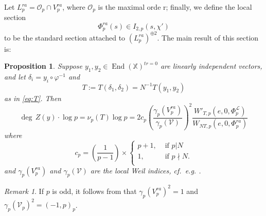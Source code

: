 \documentclass[reqno,oneside]{amsart}
\theoremstyle{plain}
\newtheorem{proposition}[theorem]{Proposition}
\theoremstyle{remark}
\newtheorem{remark}[theorem]{Remark}
\numberwithin{theorem}{section}
\newcommand{\bbX}{\mathbb X}
\newcommand{\calL}{\mathcal L}
\newcommand{\calO}{\mathcal O}
\newcommand{\calV}{\mathcal V}
\DeclareMathOperator{\End}{End}
\begin{document}
	Let $L^{ra}_{p} = \calO_{p} \cap V^{ra}_{p}$, where $\calO_{p}$ is the maximal orde                                                                                                                  r; finally, we define the local section
	\begin{equation}
	\Phi^{ra}_{p}(s) \in I_{2,p}(s, \chi')
	\end{equation} to be the standard section attached to $(L^{ra}_{p})^{\oplus 2}$.
	The main result of this section is:
	\begin{proposition} \label{prop:local intersection number}
		Suppose  $y_1, y_2 \in \End(\bbX)^{tr=0}$ are linearly  independent vectors, and let $\delta_i = y_i \circ \varphi^{-1}$ and
		\begin{equation}
		T :=  T(\delta_1, \delta_2) = N^{-1} T(y_1, y_2)
		\end{equation}
		as in \eqref{eq:T}. Then
		\begin{equation} \label{eq:local}
		\deg \, Z(y)  \cdot \log p = \nu_p(T) \log p =  2  c_p \left( \frac{ \gamma_p(V^{ra}_p)}{ \gamma_p(\calV)} \right)^2  \frac{W'_{T,p}(e, 0, \Phi^{\calL}_{p})}{W_{NT, p}(e, 0, \Phi^{ra}_{p})}
		\end{equation}
		where
		\begin{equation}
		c_p =  \left( \frac{1}{p-1} \right) \times
		\begin{cases}
		p+1, & \text{ if }  p | N \\
		1,  & \text{ if }p \nmid N . \\
		\end{cases}
		\end{equation}
		and $\gamma_p(V_p^{ra})$ and $\gamma_p(\calV)$  are the local Weil indices, cf.\ e.g. \cite[\S 8.5.3]{KRYbook}.
		
		
	\end{proposition}
	
	\begin{remark}
		 	If $p$ is odd, it follows from \cite[Appendix A]{Rao} that	$\gamma_p(V_p^{ra})^2 = 1$ and $\gamma_p(\calV_p)^2 = (-1,p)_p$.

	\end{remark}
	
	
	
\end{document}
